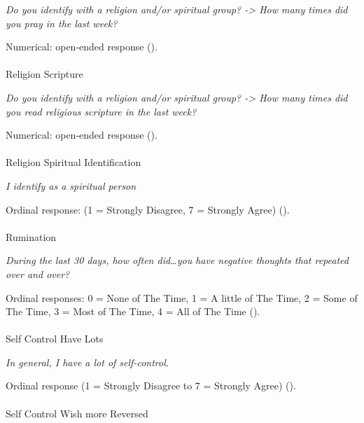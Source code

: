 \documentclass[
  single column]{article}
\makeatletter
\let\oldparagraph\paragraph
\renewcommand{\paragraph}{
    \@ifstar
      \xxxParagraphStar
      \xxxParagraphNoStar
  }
\newcommand{\xxxParagraphStar}[1]{\oldparagraph*{#1}\mbox{}}
\newcommand{\xxxParagraphNoStar}[1]{\oldparagraph{#1}\mbox{}}
\makeatother
\begin{document}
\emph{Do you identify with a religion and/or spiritual group?
-\textgreater{} How many times did you pray in the last week?}

Numerical: open-ended response ().

\paragraph{Religion Scripture}\label{religion-scripture}

\emph{Do you identify with a religion and/or spiritual group?
-\textgreater{} How many times did you read religious scripture in the
last week?}

Numerical: open-ended response ().

\paragraph{Religion Spiritual
Identification}\label{religion-spiritual-identification}

\emph{I identify as a spiritual person}

Ordinal response: (1 = Strongly Disagree, 7 = Strongly Agree)
().

\paragraph{Rumination}\label{rumination}

\emph{During the last 30 days, how often did\ldots you have negative
thoughts that repeated over and over?}

Ordinal responses: 0 = None of The Time, 1 = A little of The Time, 2 =
Some of The Time, 3 = Most of The Time, 4 = All of The Time
().

\paragraph{Self Control Have Lots}\label{self-control-have-lots}

\emph{In general, I have a lot of self-control.}

Ordinal response (1 = Strongly Disagree to 7 = Strongly Agree)
().

\paragraph{Self Control Wish more
Reversed}\label{self-control-wish-more-reversed}
\end{document}
